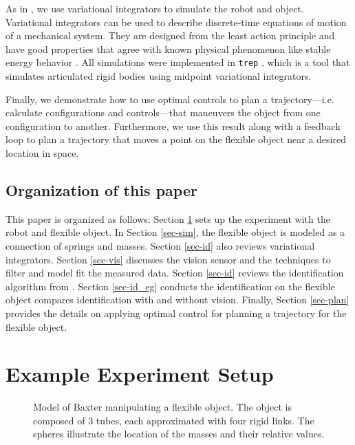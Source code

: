 \documentclass[runningheads,a4paper]{llncs}
\begin{document}
As in \cite{caldwell_coleman_correll_iros}, we use variational integrators to simulate the robot and object.  Variational integrators can be used to describe discrete-time equations of motion of a mechanical system.  They are designed from the least action principle and have good properties that agree with known physical phenomenon like stable energy behavior \cite{pekarek_murphey}. All simulations were implemented in \texttt{trep} \cite{johnson_murphey_scalable,johnson_murphey_linearization}, which is a tool that simulates articulated rigid bodies using midpoint variational integrators.

Finally, we demonstrate how to use optimal controls to plan a trajectory---i.e. calculate configurations and controls---that maneuvers the object from one configuration to another. Furthermore, we use this result along with a feedback loop to plan a trajectory that moves a point on the flexible object near a desired location in space.

\subsection{Organization of this paper}
This paper is organized as follows: Section \ref{sec-exp} sets up the experiment with the robot and flexible object. In Section \ref{sec-sim}, the flexible object is modeled as a connection of springs and masses. Section \ref{sec-id} also reviews variational integrators. Section \ref{sec-vis} discusses the vision sensor and the techniques to filter and model fit the measured data. Section \ref{sec-id} reviews the identification algorithm from \cite{caldwell_coleman_correll_iros}. Section \ref{sec-id_eg} conducts the identification on the flexible object compares identification with and without vision. Finally, Section \ref{sec-plan} provides the details on applying optimal control for planning a trajectory for the flexible object.

\section{Example Experiment Setup}
\label{sec-exp}
\begin{figure}[!htb]
\centering
\def\svgwidth{.6\textwidth}%

\caption{Model of Baxter manipulating a flexible object. The object is composed of 3 tubes, each approximated with four rigid links. The spheres illustrate the location of the masses and their relative values. }
\label{fig-baxter_y_sim}
\end{figure}
\end{document}
